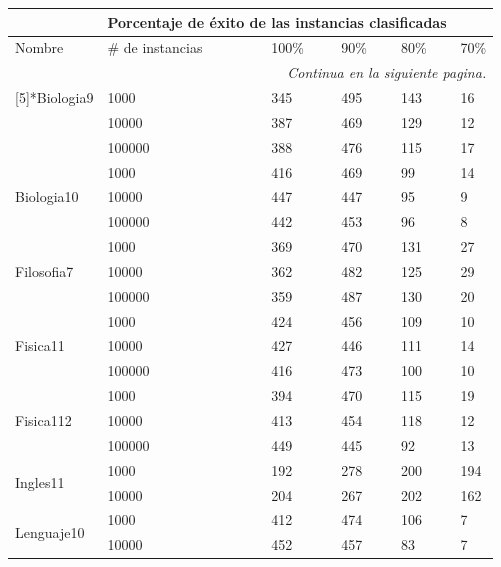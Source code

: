 \begin{longtable}{|p{3cm}|p{3cm}|p{2cm}|p{2cm}|p{2cm}|p{2cm}|}
\hline
	\rowcolor[gray]{0.5} 
	\multicolumn{2}{|c|}{Vista minable} &
	\multicolumn{4}{|c|}{Porcentaje de éxito de las instancias clasificadas}\\
	\hline
	\rowcolor[gray]{0.9} 
	Nombre & \# de instancias & 100\% & 90\% & 80\% & 70\%\\
	\hline
	\endhead
	\hline
	\multicolumn{6}{r}{\textit{Continua en la siguiente pagina.}} \\
	\endfoot
	\endlastfoot
\multirow{3}[5]{*}{Biologia9} & 1000  & 345   & 495   & 143   & 16 \\
\cline{2-6}      & 10000 & 387   & 469   & 129   & 12 \\
\cline{2-6}      & 100000 & 388   & 476   & 115   & 17 \\
\hline
\multirow{3}[6]{*}{Biologia10} & 1000  & 416   & 469   & 99    & 14 \\
\cline{2-6}      & 10000 & 447   & 447   & 95    & 9 \\
\cline{2-6}      & 100000 & 442   & 453   & 96    & 8 \\
\hline
\multirow{3}[6]{*}{Filosofia7} & 1000  & 369   & 470   & 131   & 27 \\
\cline{2-6}      & 10000 & 362   & 482   & 125   & 29 \\
\cline{2-6}      & 100000 & 359   & 487   & 130   & 20 \\
\hline
\multirow{3}[6]{*}{Fisica11} & 1000  & 424   & 456   & 109   & 10 \\
\cline{2-6}      & 10000 & 427   & 446   & 111   & 14 \\
\cline{2-6}      & 100000 & 416   & 473   & 100   & 10 \\
\hline
\multirow{3}[6]{*}{Fisica112} & 1000  & 394   & 470   & 115   & 19 \\
\cline{2-6}      & 10000 & 413   & 454   & 118   & 12 \\
\cline{2-6}      & 100000 & 449   & 445   & 92    & 13 \\
\hline
\multirow{2}[4]{*}{Ingles11} & 1000  & 192   & 278   & 200   & 194 \\
\cline{2-6}      & 10000 & 204   & 267   & 202   & 162 \\
\hline
\multirow{3}[6]{*}{Lenguaje10} & 1000  & 412   & 474   & 106   & 7 \\
\cline{2-6}      & 10000 & 452   & 457   & 83    & 7 \\

\end{longtable}
